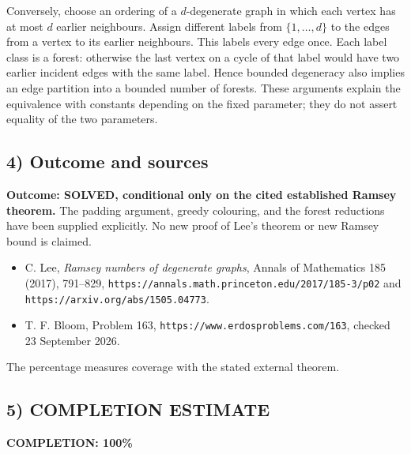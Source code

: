Conversely, choose an ordering of a $d$-degenerate graph in which each
vertex has at most $d$ earlier neighbours. Assign different labels from
$\{1,\ldots,d\}$ to the edges from a vertex to its earlier neighbours.
This labels every edge once. Each label class is a forest: otherwise
the last vertex on a cycle of that label would have two earlier incident
edges with the same label. Hence bounded degeneracy also implies an
edge partition into a bounded number of forests. These arguments explain
the equivalence with constants depending on the fixed parameter; they
do not assert equality of the two parameters.

\subsection{4) Outcome and sources}
\textbf{Outcome: SOLVED, conditional only on the cited established
Ramsey theorem.} The padding argument, greedy colouring, and the forest
reductions have been supplied explicitly. No new proof of Lee's theorem
or new Ramsey bound is claimed.
\begin{itemize}
\item C. Lee, \emph{Ramsey numbers of degenerate graphs}, Annals of
Mathematics 185 (2017), 791--829,
\texttt{https://annals.math.princeton.edu/2017/185-3/p02} and
\texttt{https://arxiv.org/abs/1505.04773}.
\item T. F. Bloom, Problem 163,
\texttt{https://www.erdosproblems.com/163}, checked 23 September 2026.
\end{itemize}
The percentage measures coverage with the stated external theorem.
\subsection{5) COMPLETION ESTIMATE}
\textbf{COMPLETION: 100\%}
